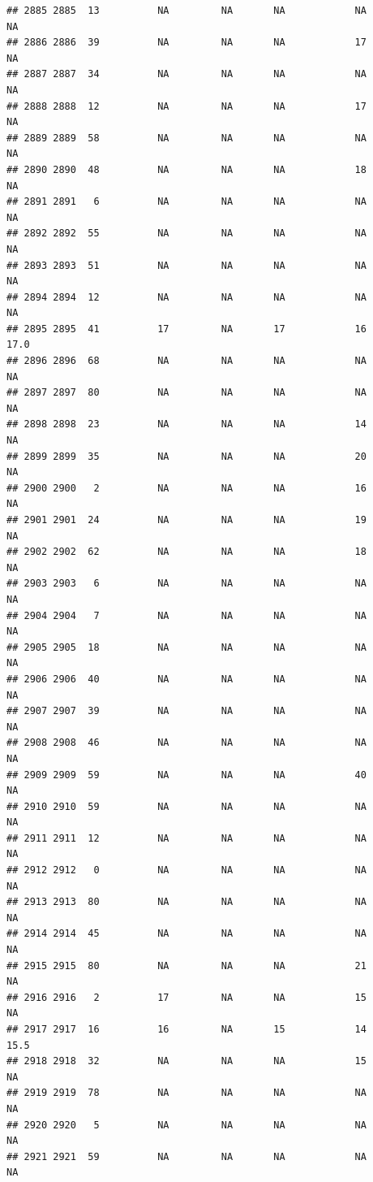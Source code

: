 \documentclass[man]{apa6}
\begin{document}
\begin{verbatim}
## 2885 2885  13          NA         NA       NA            NA       NA
## 2886 2886  39          NA         NA       NA            17       NA
## 2887 2887  34          NA         NA       NA            NA       NA
## 2888 2888  12          NA         NA       NA            17       NA
## 2889 2889  58          NA         NA       NA            NA       NA
## 2890 2890  48          NA         NA       NA            18       NA
## 2891 2891   6          NA         NA       NA            NA       NA
## 2892 2892  55          NA         NA       NA            NA       NA
## 2893 2893  51          NA         NA       NA            NA       NA
## 2894 2894  12          NA         NA       NA            NA       NA
## 2895 2895  41          17         NA       17            16     17.0
## 2896 2896  68          NA         NA       NA            NA       NA
## 2897 2897  80          NA         NA       NA            NA       NA
## 2898 2898  23          NA         NA       NA            14       NA
## 2899 2899  35          NA         NA       NA            20       NA
## 2900 2900   2          NA         NA       NA            16       NA
## 2901 2901  24          NA         NA       NA            19       NA
## 2902 2902  62          NA         NA       NA            18       NA
## 2903 2903   6          NA         NA       NA            NA       NA
## 2904 2904   7          NA         NA       NA            NA       NA
## 2905 2905  18          NA         NA       NA            NA       NA
## 2906 2906  40          NA         NA       NA            NA       NA
## 2907 2907  39          NA         NA       NA            NA       NA
## 2908 2908  46          NA         NA       NA            NA       NA
## 2909 2909  59          NA         NA       NA            40       NA
## 2910 2910  59          NA         NA       NA            NA       NA
## 2911 2911  12          NA         NA       NA            NA       NA
## 2912 2912   0          NA         NA       NA            NA       NA
## 2913 2913  80          NA         NA       NA            NA       NA
## 2914 2914  45          NA         NA       NA            NA       NA
## 2915 2915  80          NA         NA       NA            21       NA
## 2916 2916   2          17         NA       NA            15       NA
## 2917 2917  16          16         NA       15            14     15.5
## 2918 2918  32          NA         NA       NA            15       NA
## 2919 2919  78          NA         NA       NA            NA       NA
## 2920 2920   5          NA         NA       NA            NA       NA
## 2921 2921  59          NA         NA       NA            NA       NA

\end{verbatim}
\end{document}
